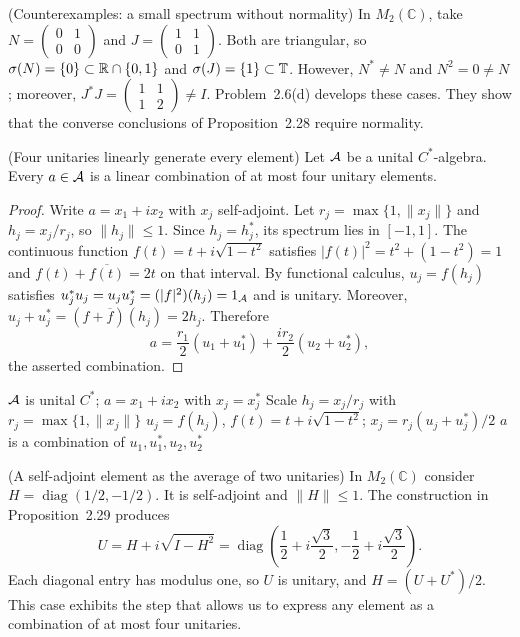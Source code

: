 \begin{cthejemplo}{(Counterexamples: a small spectrum without normality)}
In $M_2(\mathbb C)$, take
$N=\begin{pmatrix}0&1\\0&0\end{pmatrix}$ and
$J=\begin{pmatrix}1&1\\0&1\end{pmatrix}$.
Both are triangular, so
$\sigma(N)=\{0\}\subset\mathbb R\cap\{0,1\}$ and
$\sigma(J)=\{1\}\subset\mathbb T$.
However, $N^*\neq N$ and $N^2=0\neq N$;
moreover, $J^*J=\begin{pmatrix}1&1\\1&2\end{pmatrix}\neq I$.
Problem~2.6(d) develops these cases. They show that the converse conclusions
of Proposition~2.28 require normality.
\end{cthejemplo}

\begin{cthproposicion}{(Four unitaries linearly generate every element)}
Let $\mathcal A$ be a unital $C^*$-algebra. Every $a\in\mathcal A$ is a linear combination
of at most four unitary elements.
\end{cthproposicion}

\begin{proof}[Proof]
Write $a=x_1+ix_2$ with $x_j$ self-adjoint. Let
$r_j=\max\{1,\|x_j\|\}$ and $h_j=x_j/r_j$, so $\|h_j\|\le1$.
Since $h_j=h_j^*$, its spectrum lies in $[-1,1]$. The continuous function
$f(t)=t+i\sqrt{1-t^2}$ satisfies
$|f(t)|^2=t^2+(1-t^2)=1$ and $f(t)+\overline{f(t)}=2t$ on that interval.
By functional calculus, $u_j=f(h_j)$ satisfies
$u_j^*u_j=u_ju_j^*=(|f|^2)(h_j)=1_\mathcal A$ and is unitary. Moreover,
$u_j+u_j^*=(f+\overline f)(h_j)=2h_j$. Therefore
\[
 a=\frac{r_1}{2}(u_1+u_1^*)+\frac{i r_2}{2}(u_2+u_2^*),
\]
the asserted combination.
\end{proof}

\proofdiagram
{$\mathcal A$ is unital $C^*$; $a=x_1+ix_2$ with $x_j=x_j^*$}
{Scale $h_j=x_j/r_j$ with $r_j=\max\{1,\|x_j\|\}$}
{$u_j=f(h_j)$, $f(t)=t+i\sqrt{1-t^2}$; $x_j=r_j(u_j+u_j^*)/2$}
{$a$ is a combination of $u_1,u_1^*,u_2,u_2^*$}

\begin{cthejemplo}{(A self-adjoint element as the average of two unitaries)}
In $M_2(\mathbb C)$ consider
$H=\operatorname{diag}(1/2,-1/2)$.
It is self-adjoint and $\|H\|\le1$. The construction in
Proposition~2.29 produces
\[
 U=H+i\sqrt{I-H^2}
 =\operatorname{diag}\!\left(
 \frac12+i\frac{\sqrt3}{2},
 -\frac12+i\frac{\sqrt3}{2}\right).
\]
Each diagonal entry has modulus one, so $U$ is unitary, and
$H=(U+U^*)/2$. This case exhibits the step that allows us to express
any element as a combination of at most four unitaries.
\end{cthejemplo}


